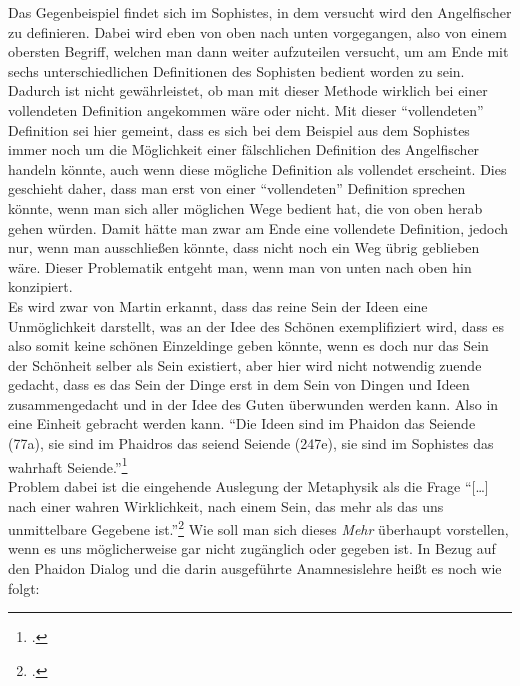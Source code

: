 Das Gegenbeispiel findet sich im Sophistes, in dem versucht wird den Angelfischer zu definieren. Dabei wird eben von oben nach unten vorgegangen, also von einem obersten Begriff, welchen man dann weiter aufzuteilen versucht, um am Ende mit sechs unterschiedlichen Definitionen des Sophisten bedient worden zu sein. Dadurch ist nicht gewährleistet, ob man mit dieser Methode wirklich bei einer vollendeten Definition angekommen wäre oder nicht. Mit dieser \enquote{vollendeten} Definition sei hier gemeint, dass es sich bei dem Beispiel aus dem Sophistes immer noch um die Möglichkeit einer fälschlichen Definition des Angelfischer handeln könnte, auch wenn diese mögliche Definition als vollendet erscheint. Dies geschieht daher, dass man erst von einer \enquote{vollendeten} Definition sprechen könnte, wenn man sich aller möglichen Wege bedient hat, die von oben herab gehen würden. Damit hätte man zwar am Ende eine vollendete Definition, jedoch nur, wenn man ausschließen könnte, dass nicht noch ein Weg übrig geblieben wäre. Dieser Problematik entgeht man, wenn man von unten nach oben hin konzipiert.\\
Es wird zwar von Martin erkannt, dass das reine Sein der Ideen eine Unmöglichkeit darstellt, was an der Idee des Schönen exemplifiziert wird, dass es also somit keine schönen Einzeldinge geben könnte, wenn es doch nur das Sein der Schönheit selber als Sein existiert, aber hier wird nicht notwendig zuende gedacht, dass es das Sein der Dinge erst in dem Sein von Dingen und Ideen zusammengedacht und in der Idee des Guten überwunden werden kann. Also in eine Einheit gebracht werden kann. 
\enquote{Die Ideen sind im Phaidon das Seiende (77a), sie sind im Phaidros das seiend Seiende (247e), sie sind im Sophistes das wahrhaft Seiende.}\footcite[vgl.][S. 131]{Martin73}\\
Problem dabei ist die eingehende Auslegung der Metaphysik als die Frage \enquote{[\dots] nach einer wahren Wirklichkeit, nach einem Sein, das mehr als das uns unmittelbare Gegebene ist.}\footcite[vgl.][S. 17]{DisseMetaphysik} Wie soll man sich dieses \emph{Mehr} überhaupt vorstellen, wenn es uns möglicherweise gar nicht zugänglich oder gegeben ist.
In Bezug auf den Phaidon Dialog und die darin ausgeführte Anamnesislehre heißt es noch wie folgt:

